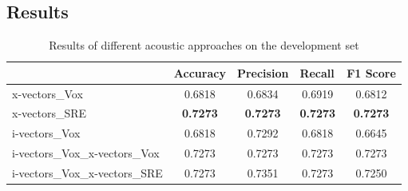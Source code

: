 \subsection{Results}
\begin{table}[t]
  \begin{center}
  \begin{tabular}{lcccc}
  \hline
  & \multicolumn{1}{l}{\textbf{Accuracy}} & \multicolumn{1}{l}{\textbf{Precision}} & \multicolumn{1}{l}{\textbf{Recall}} & \multicolumn{1}{l}{\textbf{F1 Score}} \\
  \hline
  x-vectors\_Vox           & 0.6818                               & 0.6834                                & 0.6919                             & 0.6812                               \\
  x-vectors\_SRE              & \textbf{0.7273}                               & \textbf{0.7273}                                & \textbf{0.7273}                             & \textbf{0.7273}                               \\
  i-vectors\_Vox          & 0.6818                               & 0.7292                                & 0.6818                             & 0.6645                               \\
  i-vectors\_Vox\_x-vectors\_Vox & 0.7273                               & 0.7273                                & 0.7273                             & 0.7273                               \\
  i-vectors\_Vox\_x-vectors\_SRE      & 0.7273                               & 0.7351                                & 0.7273                             & 0.7250                                \\
  \hline
  \end{tabular}
  \caption{Results of different acoustic approaches on the development set}
  \label{tab:adress_acoustics}    
\end{center}
\end{table}

